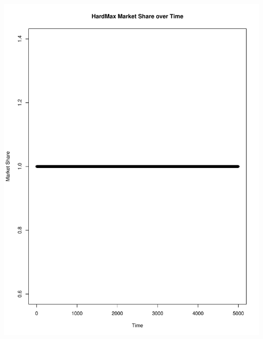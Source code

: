 \documentclass[11pt,letterpaper]{article}
\begin{document}
\includegraphics[scale=0.25]{standard_ms_over_time} \\
\vspace{0.25cm}
\end{document}
